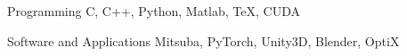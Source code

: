 
\begin{cvskills}

	\cvskill
	{Programming}
    {C, C++, Python, Matlab, \TeX, CUDA}

	\cvskill
	{Software and Applications}
    {Mitsuba, PyTorch, Unity3D, Blender, OptiX}


\end{cvskills}
